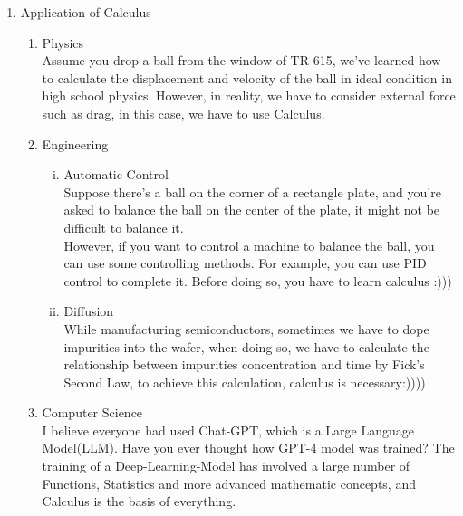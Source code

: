 \documentclass[12px]{article}
\begin{document}
\begin{enumerate}
    \item Application of Calculus
    \begin{enumerate}[(1).]
        \item Physics\\
        \hspace*{2em}Assume you drop a ball from the window of TR-615, we’ve learned how to calculate the displacement and velocity of the ball in ideal condition in high school physics. However, in reality, we have to consider external force such as drag, in this case, we have to use Calculus.
        \item Engineering
        \begin{enumerate}[i.]
            \item Automatic Control\\
            \hspace*{2em}Suppose there’s a ball on the corner of a rectangle plate, and you’re asked to balance the ball on the center of the plate, it might not be difficult to balance it.\\ 
            \hspace*{2em}However, if you want to control a machine to balance the ball, you can use some controlling methods. For example, you can use PID control to complete it. Before doing so, you have to learn calculus :)))

            \item Diffusion\\
            \hspace*{2em} While manufacturing semiconductors, sometimes we have to dope impurities into the wafer, when doing so, we have to calculate the relationship between impurities concentration and time by Fick’s Second Law, to achieve this calculation, calculus is necessary:))))
        \end{enumerate}
        \item Computer Science\\
        \hspace*{2em} I believe everyone had used Chat-GPT, which is a Large Language Model(LLM). Have you ever thought how GPT-4 model was trained? The training of a Deep-Learning-Model has involved a large number of Functions, Statistics and more advanced mathematic concepts, and Calculus is the basis of everything.
        
    \end{enumerate}
\end{enumerate}
\end{document}
